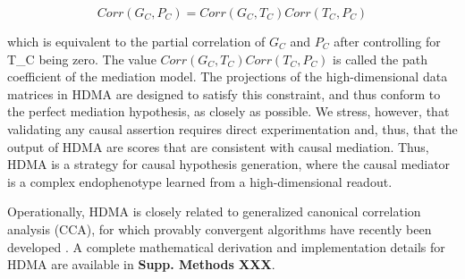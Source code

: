 \documentclass[
]{article}
\begin{document}
\begin{equation*}
Corr(G_C,P_C) = Corr(G_C,T_C)Corr(T_C,P_C)
\end{equation*}

which is equivalent to the partial correlation of \(G_C\) and \(P_C\)
after controlling for T\_C being zero. The value
\(Corr(G_C,T_C)Corr(T_C,P_C)\) is called the path coefficient of the
mediation model. The projections of the high-dimensional data matrices
in HDMA are designed to satisfy this constraint, and thus conform to the
perfect mediation hypothesis, as closely as possible. We stress,
however, that validating any causal assertion requires direct
experimentation and, thus, that the output of HDMA are scores that are
consistent with causal mediation. Thus, HDMA is a strategy for causal
hypothesis generation, where the causal mediator is a complex
endophenotype learned from a high-dimensional readout.

Operationally, HDMA is closely related to generalized canonical
correlation analysis (CCA), for which provably convergent algorithms
have recently been developed \cite{rgcca}. A complete mathematical
derivation and implementation details for HDMA are available in
\textbf{Supp. Methods XXX}.
\end{document}
